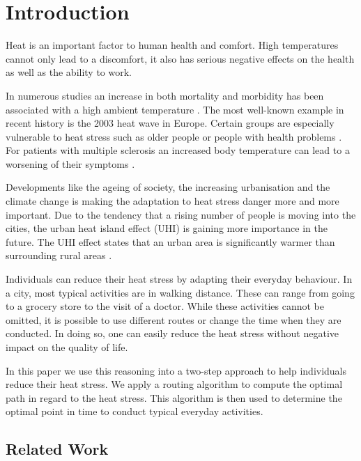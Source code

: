 
\section{Introduction}

Heat is an important factor to human health and comfort. High temperatures cannot only lead to a discomfort, it also has serious negative effects on the health as well as the ability to work. 

In numerous studies an increase in both mortality and
morbidity has been associated with a high ambient temperature \parencite{Basu2009}. The most well-known example in recent history is the 2003 heat wave in Europe. 
Certain groups are especially vulnerable to heat stress such as older people or people with health problems \parencite{Huebler2007}. For patients with multiple sclerosis an increased body temperature can lead to a worsening of their symptoms \parencite{Davis2010}.

Developments like the ageing of society, the increasing urbanisation and the climate change is making the adaptation to heat stress danger more and more important. Due to the tendency that a rising number of people is moving into the cities, the urban heat island effect (UHI) is gaining more importance in the future. The UHI effect states that an urban area is significantly warmer than surrounding rural areas \parencite{Prashad2014}. 

Individuals can reduce their heat stress by adapting their everyday behaviour. In a city, most typical activities are in walking distance. These can range from going to a grocery store to the visit of a doctor. While these activities cannot be omitted, it is possible to use different routes or change the time when they are conducted. In doing so, one can easily reduce the heat stress without negative impact on the quality of life. 

In this paper we use this reasoning into a two-step approach to help individuals reduce their heat stress. We apply a routing algorithm to compute the optimal path in regard to the heat stress. This algorithm is then used to determine the optimal point in time to conduct typical everyday activities. 
  
\subsection{Related Work} 

